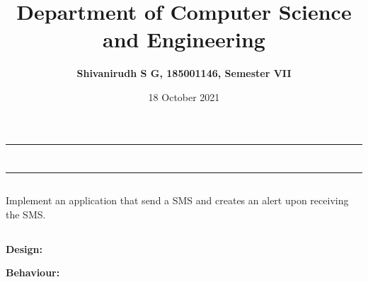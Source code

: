 \documentclass[12pt,letterpaper]{article}
\title{\textbf{Department of Computer Science and Engineering}}
\author{\textbf{Shivanirudh S G, 185001146, Semester VII }}
\date{18 October 2021}
\begin{document}
\maketitle
\hrule
\section*{}
\hrule 
\bigskip\bigskip

\subsection*{}

\subsection*{}
\begin{flushleft}
Implement an application that send a SMS and creates an alert upon receiving the SMS. 
\end{flushleft}

\subsection*{}
\subsubsection*{}
\textbf{Design:}
\begin{flushleft}

\end{flushleft}

\textbf{Behaviour:}
\begin{flushleft}

\end{flushleft}

\newpage
\end{document}
